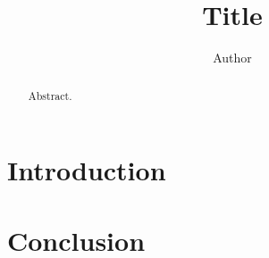 \documentclass{article}
\title{Title}
\author{Author}
\date{}
\begin{document}
\maketitle

\begin{abstract}
Abstract.
\end{abstract}

\section{Introduction}

\section{Conclusion}
\end{document}
